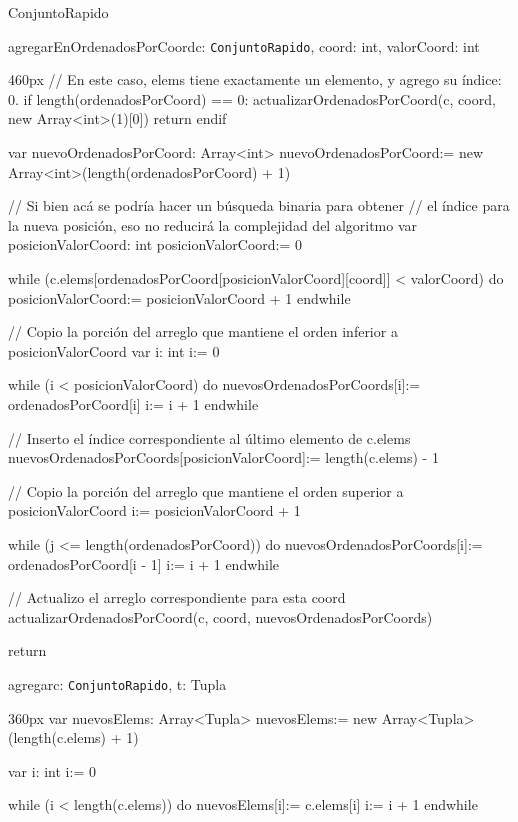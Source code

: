 \documentclass[10pt,a4paper]{article}
\begin{document}
\begin{ModuloImplements}{ConjuntoRapido}{{}}
\begin{proc}{agregarEnOrdenadosPorCoord}{\Inout c: \texttt{ConjuntoRapido}, \In coord: int, \In valorCoord: int}{}
\begin{ImplementationCode}{460px}
      // En este caso, elems tiene exactamente un elemento, y agrego su índice: 0.
      if length(ordenadosPorCoord) == 0:
        actualizarOrdenadosPorCoord(c, coord, new Array<int>(1)[0])
        return
      endif

      var nuevoOrdenadosPorCoord: Array<int>
          nuevoOrdenadosPorCoord:= new Array<int>(length(ordenadosPorCoord) + 1)

      // Si bien acá se podría hacer un búsqueda binaria para obtener
      // el índice para la nueva posición, eso no reducirá la complejidad del algoritmo
      var posicionValorCoord: int
          posicionValorCoord:= 0
      
      while (c.elems[ordenadosPorCoord[posicionValorCoord][coord]] < valorCoord) do
        posicionValorCoord:= posicionValorCoord + 1
      endwhile

      // Copio la porción del arreglo que mantiene el orden inferior a posicionValorCoord
      var i: int
          i:= 0

      while (i < posicionValorCoord) do
        nuevosOrdenadosPorCoords[i]:= ordenadosPorCoord[i]
        i:= i + 1
      endwhile

      // Inserto el índice correspondiente al último elemento de c.elems
      nuevosOrdenadosPorCoords[posicionValorCoord]:= length(c.elems) - 1

      // Copio la porción del arreglo que mantiene el orden superior a posicionValorCoord
      i:= posicionValorCoord + 1

      while (j <= length(ordenadosPorCoord)) do
        nuevosOrdenadosPorCoords[i]:= ordenadosPorCoord[i - 1]
        i:= i + 1
      endwhile
      
      // Actualizo el arreglo correspondiente para esta coord
      actualizarOrdenadosPorCoord(c, coord, nuevosOrdenadosPorCoords)

      return
    \end{ImplementationCode}
  \end{proc}
  \begin{proc}{agregar}{\Inout c: \texttt{ConjuntoRapido}, \In t: Tupla}{}
    \begin{ImplementationCode}{360px}
      var nuevosElems: Array<Tupla>
          nuevosElems:= new Array<Tupla>(length(c.elems) + 1)
      
      var i: int
          i:= 0

      while (i < length(c.elems)) do
        nuevosElems[i]:= c.elems[i]
        i:= i + 1
      endwhile


\end{ImplementationCode}
\end{proc}
\end{ModuloImplements}
\end{document}
